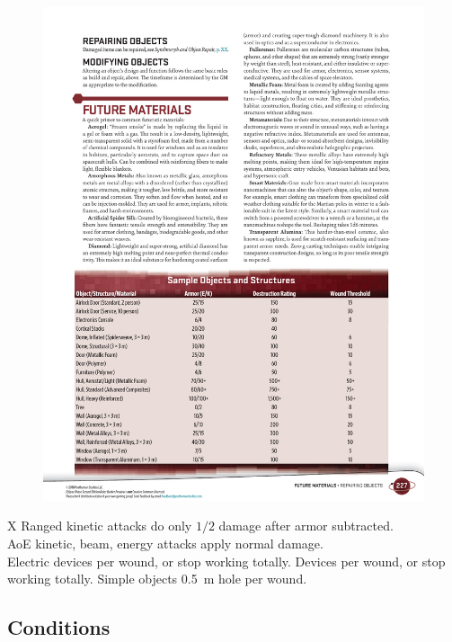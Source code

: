 \begin{figure}[h!]%
   \includegraphics[scale=0.71]{gfx/combat-objects}%
\end{figure}%

\begin{eptable}{ X }
   Ranged kinetic attacks do only $1/2$ damage after armor subtracted.\\
   AoE kinetic, beam, energy attacks apply normal damage.\\
   Electric devices  per wound, or stop working totally.
   Devices  per wound, or stop working totally.
   Simple objects \SI{.5}{m} hole per wound.
\end{eptable}


\bigskip

\subsection*{Conditions}


